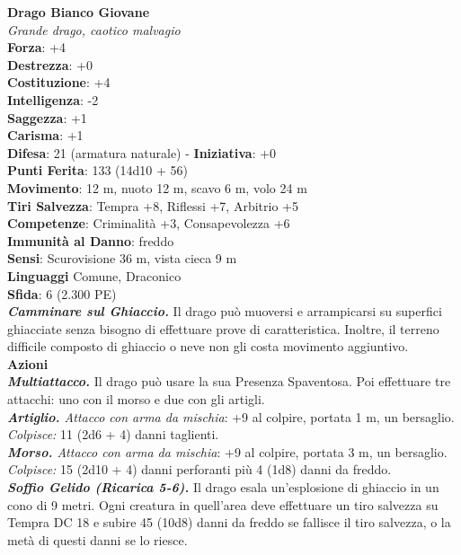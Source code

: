 \begin{multicols}{2}
\medskip\textbf{Drago Bianco Giovane}\\
\emph{Grande drago, caotico malvagio} \\
\textbf{Forza}: +4 \\
\textbf{Destrezza}: +0 \\
\textbf{Costituzione}: +4\\
\textbf{Intelligenza}: -2\\
\textbf{Saggezza}: +1\\
\textbf{Carisma}: +1\\
\textbf{Difesa}: 21 (armatura naturale) - \textbf{Iniziativa}: +0\\
\textbf{Punti Ferita}: 133 (14d10 + 56)\\
\textbf{Movimento}: 12 m, nuoto 12 m, scavo 6 m, volo 24 m\\
\textbf{Tiri Salvezza}: Tempra +8, Riflessi +7, Arbitrio +5\\
\textbf{Competenze}: Criminalità +3, Consapevolezza +6\\
\textbf{Immunità al Danno}: freddo\\
\textbf{Sensi}: Scurovisione 36 m, vista cieca 9 m\\
\textbf{Linguaggi} Comune, Draconico\\
\textbf{Sfida}: 6 (2.300 PE)\smallskip\\
\emph{\textbf{Camminare sul Ghiaccio.}} Il drago può muoversi e arrampicarsi su superfici ghiacciate senza bisogno di effettuare prove di caratteristica. Inoltre, il terreno difficile composto di ghiaccio o neve non gli costa movimento aggiuntivo.\\
\smallskip\textbf{Azioni}\\
\emph{\textbf{Multiattacco.}} Il drago può usare la sua Presenza Spaventosa. Poi effettuare tre attacchi: uno con il morso e due con gli artigli.\\
\emph{\textbf{Artiglio.} Attacco con arma da mischia}: +9 al colpire, portata 1 m, un bersaglio.\\
\emph{Colpisce:} 11 (2d6 + 4) danni taglienti.\\
\emph{\textbf{Morso.} Attacco con arma da mischia}: +9 al colpire, portata 3 m, un bersaglio.\\
\emph{Colpisce:} 15 (2d10 + 4) danni perforanti più 4 (1d8) danni da freddo.\\
\emph{\textbf{Soffio Gelido (Ricarica 5-6).}} Il drago esala un'esplosione di ghiaccio in un cono di 9 metri. Ogni creatura in quell'area deve effettuare un tiro salvezza su Tempra DC  18 e subire 45 (10d8) danni da freddo se fallisce il tiro salvezza, o la metà di questi danni se lo riesce.\\

\end{multicols}
